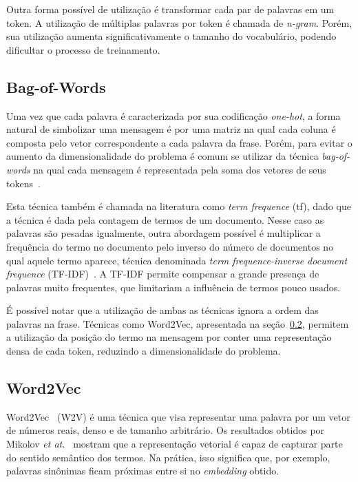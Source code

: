 Outra forma possível de utilização é transformar cada par de palavras em um token.
A utilização de múltiplas palavras por token é chamada de \textit{n-gram}.
Porém, sua utilização aumenta significativamente o tamanho do vocabulário, podendo dificultar o processo de treinamento.

\subsection{Bag-of-Words}

Uma vez que cada palavra é caracterizada por sua codificação \textit{one-hot}, a forma natural de simbolizar uma mensagem
é por uma matriz na qual cada coluna é composta pelo vetor correspondente a cada palavra da frase.
Porém, para evitar o aumento da dimensionalidade do problema é comum se utilizar da técnica \textit{bag-of-words} na
qual cada mensagem é representada pela soma dos vetores de seus tokens~\cite{schutze08}.

Esta técnica também é chamada na literatura como \textit{term frequence} (tf), dado que a técnica é dada pela contagem
de termos de um documento.
Nesse caso as palavras são pesadas igualmente, outra abordagem possível é multiplicar a frequência do termo no documento
pelo inverso do número de documentos no qual aquele termo aparece, técnica denominada \textit{term frequence-inverse
document frequence} (TF-IDF)~\cite{salton88}.
A TF-IDF permite compensar a grande presença de palavras muito frequentes, que limitariam a influência de termos pouco
usados.

É possível notar que a utilização de ambas as técnicas ignora a ordem das palavras na frase.
Técnicas como Word2Vec, apresentada na seção~\ref{w2v}, permitem a utilização da posição do termo na mensagem por conter
uma representação densa de cada token, reduzindo a dimensionalidade do problema.

\subsection{Word2Vec}\label{w2v}

Word2Vec~\cite{mikolov13} (W2V) é uma técnica que visa representar uma palavra por um vetor de números reais, denso e de
tamanho arbitrário.
Os resultados obtidos por Mikolov \textit{et at.}~\cite{mikolov13} mostram que a representação vetorial é capaz de
capturar parte do sentido semântico dos termos.
Na prática, isso significa que, por exemplo, palavras sinônimas ficam próximas entre si no \textit{embedding} obtido.

